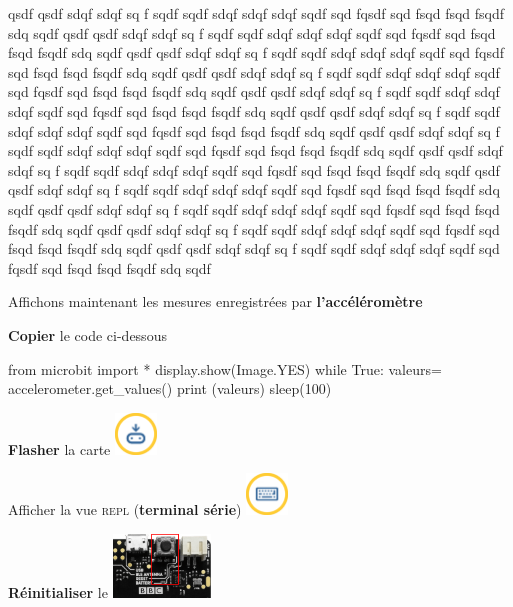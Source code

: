 qsdf qsdf sdqf sdqf sq f sqdf sqdf sdqf sdqf sdqf sqdf  sqd fqsdf sqd fsqd fsqd fsqdf sdq sqdf
qsdf qsdf sdqf sdqf sq f sqdf sqdf sdqf sdqf sdqf sqdf  sqd fqsdf sqd fsqd fsqd fsqdf sdq sqdf
qsdf qsdf sdqf sdqf sq f sqdf sqdf sdqf sdqf sdqf sqdf  sqd fqsdf sqd fsqd fsqd fsqdf sdq sqdf
qsdf qsdf sdqf sdqf sq f sqdf sqdf sdqf sdqf sdqf sqdf  sqd fqsdf sqd fsqd fsqd fsqdf sdq sqdf
qsdf qsdf sdqf sdqf sq f sqdf sqdf sdqf sdqf sdqf sqdf  sqd fqsdf sqd fsqd fsqd fsqdf sdq sqdf
qsdf qsdf sdqf sdqf sq f sqdf sqdf sdqf sdqf sdqf sqdf  sqd fqsdf sqd fsqd fsqd fsqdf sdq sqdf
qsdf qsdf sdqf sdqf sq f sqdf sqdf sdqf sdqf sdqf sqdf  sqd fqsdf sqd fsqd fsqd fsqdf sdq sqdf
qsdf qsdf sdqf sdqf sq f sqdf sqdf sdqf sdqf sdqf sqdf  sqd fqsdf sqd fsqd fsqd fsqdf sdq sqdf
qsdf qsdf sdqf sdqf sq f sqdf sqdf sdqf sdqf sdqf sqdf  sqd fqsdf sqd fsqd fsqd fsqdf sdq sqdf
qsdf qsdf sdqf sdqf sq f sqdf sqdf sdqf sdqf sdqf sqdf  sqd fqsdf sqd fsqd fsqd fsqdf sdq sqdf
qsdf qsdf sdqf sdqf sq f sqdf sqdf sdqf sdqf sdqf sqdf  sqd fqsdf sqd fsqd fsqd fsqdf sdq sqdf
qsdf qsdf sdqf sdqf sq f sqdf sqdf sdqf sdqf sdqf sqdf  sqd fqsdf sqd fsqd fsqd fsqdf sdq sqdf


\begin{methode}
	Affichons maintenant les mesures enregistrées
	par \textbf{l'accéléromètre}
\begin{multicols}{2}

	\textbf{Copier} le code ci-dessous
	\begin{mucode}
from microbit import *
display.show(Image.YES)
while True:
    valeurs= accelerometer.get_values()
    print (valeurs)
    sleep(100)
	\end{mucode}

	\textbf{Flasher} la carte 
	\hfill\includegraphics[width=3em,valign=t]{res/flash.png}

	Afficher la vue \textsc{repl} (\textbf{terminal série})
	\hfill\includegraphics[width=3em,valign=t]{res/ft_repl.png}

	\textbf{Réinitialiser} le \mb
	\hfill\includegraphics[width=7em,valign=c]{res/mu/060.png}

\end{multicols}
\end{methode}

